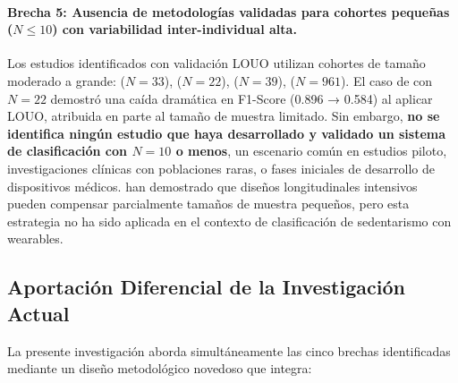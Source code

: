 \paragraph{Brecha 5: Ausencia de metodologías validadas para cohortes pequeñas ($N \leq 10$) con variabilidad inter-individual alta.}

Los estudios identificados con validación LOUO utilizan cohortes de tamaño moderado a grande: \cite{Fuller2021Predicting} ($N=33$), \cite{Mathew2024LOSO} ($N=22$), \cite{OGrady2024AppleWatch} ($N=39$), \cite{Marino2024ARIC} ($N=961$). El caso de \cite{Mathew2024LOSO} con $N=22$ demostró una caída dramática en F1-Score (0.896 → 0.584) al aplicar LOUO, atribuida en parte al tamaño de muestra limitado. Sin embargo, \textbf{no se identifica ningún estudio que haya desarrollado y validado un sistema de clasificación con $N=10$ o menos}, un escenario común en estudios piloto, investigaciones clínicas con poblaciones raras, o fases iniciales de desarrollo de dispositivos médicos. \cite{Bolger2013} han demostrado que diseños longitudinales intensivos pueden compensar parcialmente tamaños de muestra pequeños, pero esta estrategia no ha sido aplicada en el contexto de clasificación de sedentarismo con wearables.

\subsection{Aportación Diferencial de la Investigación Actual}
\label{subsec:aportacion_diferencial}

La presente investigación aborda simultáneamente las cinco brechas identificadas mediante un diseño metodológico novedoso que integra:

